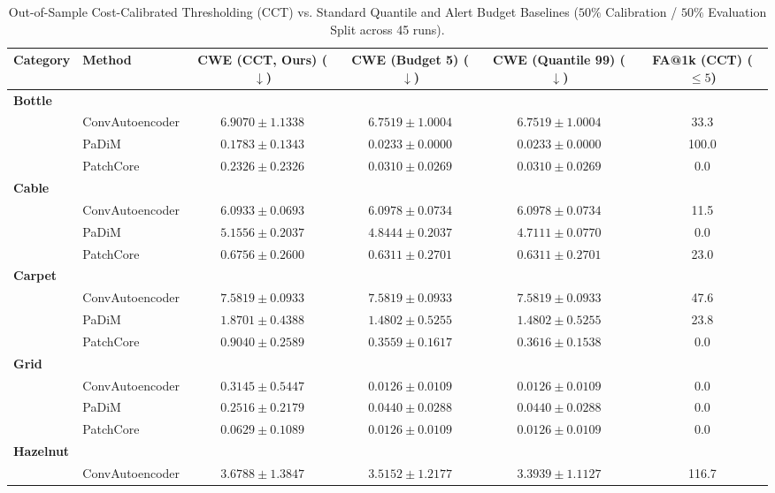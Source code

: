 \begin{table}[t]
\centering
\small
\caption{Out-of-Sample Cost-Calibrated Thresholding (CCT) vs. Standard Quantile and Alert Budget Baselines ($50\%$ Calibration / $50\%$ Evaluation Split across 45 runs).}
\label{tab:cct_ablation}
\begin{tabular}{llcccc}
\toprule
\textbf{Category} & \textbf{Method} & \textbf{CWE (CCT, Ours)} ($\downarrow$) & \textbf{CWE (Budget 5)} ($\downarrow$) & \textbf{CWE (Quantile 99)} ($\downarrow$) & \textbf{FA@1k (CCT)} ($\le 5$) \\
\midrule
\multicolumn{6}{l}{\textbf{Bottle}} \\
 & ConvAutoencoder & $6.9070 \pm 1.1338$ & $6.7519 \pm 1.0004$ & $6.7519 \pm 1.0004$ & 33.3 \\
 & PaDiM & $0.1783 \pm 0.1343$ & $0.0233 \pm 0.0000$ & $0.0233 \pm 0.0000$ & 100.0 \\
 & PatchCore & $0.2326 \pm 0.2326$ & $0.0310 \pm 0.0269$ & $0.0310 \pm 0.0269$ & 0.0 \\
\midrule
\multicolumn{6}{l}{\textbf{Cable}} \\
 & ConvAutoencoder & $6.0933 \pm 0.0693$ & $6.0978 \pm 0.0734$ & $6.0978 \pm 0.0734$ & 11.5 \\
 & PaDiM & $5.1556 \pm 0.2037$ & $4.8444 \pm 0.2037$ & $4.7111 \pm 0.0770$ & 0.0 \\
 & PatchCore & $0.6756 \pm 0.2600$ & $0.6311 \pm 0.2701$ & $0.6311 \pm 0.2701$ & 23.0 \\
\midrule
\multicolumn{6}{l}{\textbf{Carpet}} \\
 & ConvAutoencoder & $7.5819 \pm 0.0933$ & $7.5819 \pm 0.0933$ & $7.5819 \pm 0.0933$ & 47.6 \\
 & PaDiM & $1.8701 \pm 0.4388$ & $1.4802 \pm 0.5255$ & $1.4802 \pm 0.5255$ & 23.8 \\
 & PatchCore & $0.9040 \pm 0.2589$ & $0.3559 \pm 0.1617$ & $0.3616 \pm 0.1538$ & 0.0 \\
\midrule
\multicolumn{6}{l}{\textbf{Grid}} \\
 & ConvAutoencoder & $0.3145 \pm 0.5447$ & $0.0126 \pm 0.0109$ & $0.0126 \pm 0.0109$ & 0.0 \\
 & PaDiM & $0.2516 \pm 0.2179$ & $0.0440 \pm 0.0288$ & $0.0440 \pm 0.0288$ & 0.0 \\
 & PatchCore & $0.0629 \pm 0.1089$ & $0.0126 \pm 0.0109$ & $0.0126 \pm 0.0109$ & 0.0 \\
\midrule
\multicolumn{6}{l}{\textbf{Hazelnut}} \\
 & ConvAutoencoder & $3.6788 \pm 1.3847$ & $3.5152 \pm 1.2177$ & $3.3939 \pm 1.1127$ & 116.7 \\

\end{tabular}
\end{table}
